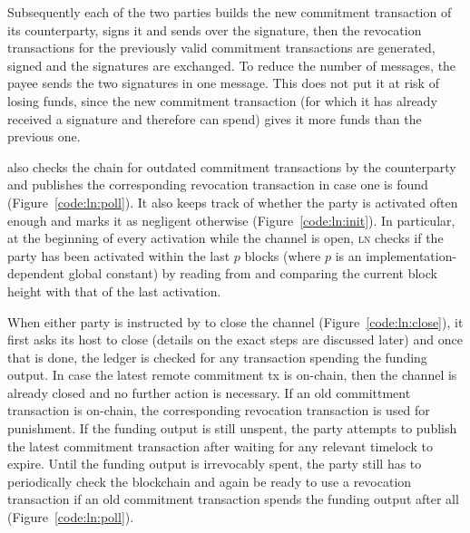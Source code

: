   Subsequently each of the two parties builds the new commitment transaction of
  its counterparty, signs it and sends over the signature, then the revocation
  transactions for the previously valid commitment transactions are generated,
  signed and the signatures are exchanged. To reduce the number of messages, the
  payee sends the two signatures in one message. This does not put it at risk of
  losing funds, since the new commitment transaction (for which it has already
  received a signature and therefore can spend) gives it more funds than the
  previous one.

  \pchan also checks the chain for outdated commitment transactions by the
  counterparty and publishes the corresponding revocation transaction in case
  one is found (Figure~\ref{code:ln:poll}). It also keeps track of whether the
  party is activated often enough and marks it as negligent otherwise
  (Figure~\ref{code:ln:init}). In particular, at the beginning of every activation
  while the channel is open, \textsc{ln} checks if the party has been activated
  within the last $p$ blocks (where $p$ is an implementation-dependent global
  constant) by reading from \ledger and comparing the current block height with
  that of the last activation.

  When either party is instructed by \environment to close the channel
  (Figure~\ref{code:ln:close}), it first asks its host to close (details on the
  exact steps are discussed later) and once that is done, the ledger is checked
  for any transaction spending the funding output. In case the latest remote
  commitment tx is on-chain, then the channel is already closed and no further
  action is necessary. If an old committment transaction is on-chain, the
  corresponding revocation transaction is used for punishment. If the funding
  output is still unspent, the party attempts to publish the latest commitment
  transaction after waiting for any relevant timelock to expire. Until the
  funding output is irrevocably spent, the party still has to periodically check
  the blockchain and again be ready to use a revocation transaction if an old
  commitment transaction spends the funding output after all
  (Figure~\ref{code:ln:poll}).

